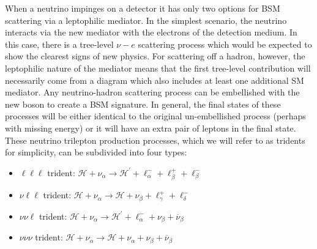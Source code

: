 When a neutrino impinges on a detector it has only two options for BSM scattering via a leptophilic mediator. In the simplest scenario, the neutrino interacts via the new mediator with the electrons of the detection medium. In this case, there is a tree-level $\nu-e$ scattering process which would be expected to show the clearest signs of new physics. For scattering off a hadron, however, the leptophilic nature of the mediator means that the first tree-level contribution will necessarily come from a diagram which also includes at least one additional SM mediator.
%
Any neutrino-hadron scattering process can be embellished with the new boson to create a BSM signature. In general, the final states of these processes will be either identical to the original un-embellished process (perhaps with missing energy) or it will have an extra pair of leptons in the final state. These neutrino trilepton production processes, which we will refer to as tridents for simplicity, can be subdivided into four types:\renewcommand{\arraystretch}{1.0}
%
\begin{itemize}
%
\item $\ell \ell \ell$ trident: $\mathcal{H} + \nu_\alpha \to \mathcal{H}^\prime + \ell^-_\alpha + \ell^+_\beta + \ell^-_\beta$
%
\item $\nu \ell \ell$ trident: $\mathcal{H} + \nu_\alpha \to \mathcal{H} + \nu_\beta + \ell^+_\gamma + \ell^-_\delta$
%
\item $\nu \nu \ell$ trident: $\mathcal{H} + \nu_\alpha \to \mathcal{H}^\prime + \ell^-_\alpha + \nu_\beta + \overline{\nu}_\beta$
%
\item $\nu \nu \nu$ trident: $\mathcal{H} + \nu_\alpha \to \mathcal{H} + \nu_\alpha + \nu_\beta + \overline{\nu}_\beta$
%
\end{itemize}
%

